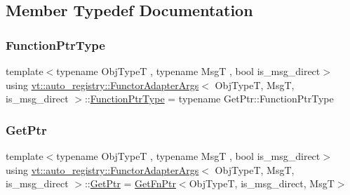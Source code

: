 \subsection{Member Typedef Documentation}
\mbox{\label{structvt_1_1auto__registry_1_1_functor_adapter_args_ae2dba60ea2070d1b36d63bd466abf80e}} 
\subsubsection{\texorpdfstring{Function\+Ptr\+Type}{FunctionPtrType}}
{\footnotesize\ttfamily template$<$typename Obj\+TypeT , typename MsgT , bool is\+\_\+msg\+\_\+direct$>$ \\
using \hyperlink{structvt_1_1auto__registry_1_1_functor_adapter_args}{vt\+::auto\+\_\+registry\+::\+Functor\+Adapter\+Args}$<$ Obj\+TypeT, MsgT, is\+\_\+msg\+\_\+direct $>$\+::\hyperlink{structvt_1_1auto__registry_1_1_functor_adapter_args_ae2dba60ea2070d1b36d63bd466abf80e}{Function\+Ptr\+Type} =  typename Get\+Ptr\+::\+Function\+Ptr\+Type}

\mbox{\label{structvt_1_1auto__registry_1_1_functor_adapter_args_ae3d4f4165ebb4b537238562514246677}} 
\subsubsection{\texorpdfstring{Get\+Ptr}{GetPtr}}
{\footnotesize\ttfamily template$<$typename Obj\+TypeT , typename MsgT , bool is\+\_\+msg\+\_\+direct$>$ \\
using \hyperlink{structvt_1_1auto__registry_1_1_functor_adapter_args}{vt\+::auto\+\_\+registry\+::\+Functor\+Adapter\+Args}$<$ Obj\+TypeT, MsgT, is\+\_\+msg\+\_\+direct $>$\+::\hyperlink{structvt_1_1auto__registry_1_1_functor_adapter_args_ae3d4f4165ebb4b537238562514246677}{Get\+Ptr} =  \hyperlink{structvt_1_1auto__registry_1_1_get_fn_ptr}{Get\+Fn\+Ptr}$<$Obj\+TypeT, is\+\_\+msg\+\_\+direct, MsgT$>$}

